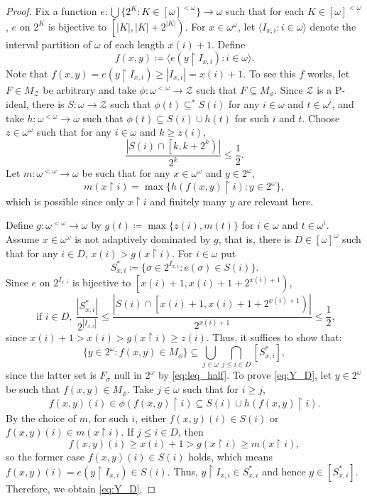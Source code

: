 \documentclass[a4paper,12pt]{amsart}
\theoremstyle{definition}
\numberwithin{thm}{section}
\numberwithin{equation}{section}
\newcommand{\oo}{{\omega}^\omega}
\newcommand{\ooo}{[{\omega}]^\omega}
\newcommand{\fsq}{\omega^{<\omega}}
\newcommand{\on}{\mathpunct{\upharpoonright}}
\newcommand{\Z}{\mathcal{Z}}
\begin{document}
	\begin{proof}
		Fix a function $e\colon\bigcup\{2^K:K\in[\omega]^{<\omega}\}\to\omega$ such that for each $K\in[\omega]^{<\omega}$, $e$ on $2^K$ is bijective to $\left[|K|, |K|+2^{|K|}\right)$. For $x\in\oo$, let $\langle I_{x,i}:i\in\omega\rangle$ denote the interval partition of $\omega$ of each length $x(i)+1$. Define
        \[
        f(x,y)\coloneq\langle e(y\on I_{x,i}):i\in\omega \rangle.
        \]
        Note that $f(x,y)=e(y\on I_{x,i})\geq |I_{x,i}|=x(i)+1$. To see this $f$ works, let $F\in M_\Z$ be arbitrary and take $\phi\colon\fsq\to\Z$ such that $F\subseteq M_\phi$. Since $\Z$ is a P-ideal, there is $S\colon\omega\to\Z$ such that $\phi(t)\subseteq^* S(i)$ for any $i\in\omega$ and $t\in\omega^i$, and take $h\colon\fsq\to\omega$ such that $\phi(t)\subseteq S(i) \cup h(t)$ for such $i$ and $t$.
		Choose $z\in\oo$ such that for any $i\in\omega$ and $k\geq z(i)$, 
		\[\frac{|S(i)\cap\left[k,k+ 2^{k}\right)|}{2^{k}}\leq\frac{1}{2}.\]
		Let $m\colon\fsq\to\omega$ be such that for any $x\in\oo$ and $y\in2^\omega$,
		\[m(x\on i)=\max\{h(f(x,y)\on i):y\in2^\omega\},\]
		which is possible since only $x\on i$ and finitely many $y$ are relevant here.
		
		Define $g\colon\fsq\to\omega$ by $g(t)\coloneqq\max\{z(i),m(t)\}$ for $i\in\omega$ and $t\in\omega^i$. Assume $x\in\oo$ is not adaptively dominated by $g$, that is, there is $D\in\ooo$ such that for any $i\in D$, $x(i)>g(x\on i)$. For $i\in\omega$ put
        \[
        S^*_{x,i}\coloneqq\{\sigma\in2^{I_{x,i}}:e(\sigma)\in S(i)\}.
        \]
        Since $e$ on $2^{I_{x,i}}$ is bijective to $\left[x(i)+1, x(i)+1+2^{x(i)+1}\right)$, 
        \begin{equation}\label{eq:leq_half}
            \text{ if }i\in D,~\frac {|S^*_{x,i}|}{2^{|I_{x,i}|}}\leq\frac{|S(i)\cap\left[x(i)+1,x(i)+1+ 2^{x(i)+1}\right)|}{2^{x(i)+1}}\leq\frac{1}{2},
        \end{equation}
		since $x(i)+1>x(i)> g(x\on i)\geq z(i)$.
		Thus, it suffices to show that:
		\begin{equation}\label{eq:Y_D}
			\{y\in 2^\omega:f(x,y)\in M_\phi\}\subseteq\bigcup_{j\in\omega}\bigcap_{j\leq i\in D}[S_{x,i}^*],
		\end{equation} 
        since the latter set is $F_\sigma$ null in $2^\omega$ by \eqref{eq:leq_half}.
		To prove \eqref{eq:Y_D}, let $y\in 2^\omega$ be such that $f(x,y)\in M_\phi$. Take $j\in\omega$ such that for $i\geq j$, 
		\[
        f(x,y)(i) \in \phi(f(x,y)\on i)\subseteq S(i)\cup h(f(x,y)\on i).
        \]
		By the choice of $m$, for such $i$, either $f(x,y)(i) \in  S(i)$ or $f(x,y)(i) \in  m(x\on i)$. If $j\leq i\in D$, then
        \[
        f(x,y)(i)\geq x(i)+1>g(x\on i)\geq m(x\on i),
        \]
        so the former case $f(x,y)(i) \in  S(i)$ holds, which means $f(x,y)(i)=e(y\on I_{x,i})\in S(i)$. Thus, $y\on I_{x,i}\in S^*_{x,i}$ and hence $y\in[S_{x,i}^*]$.
		Therefore, we obtain \eqref{eq:Y_D}.
	\end{proof}
\end{document}
